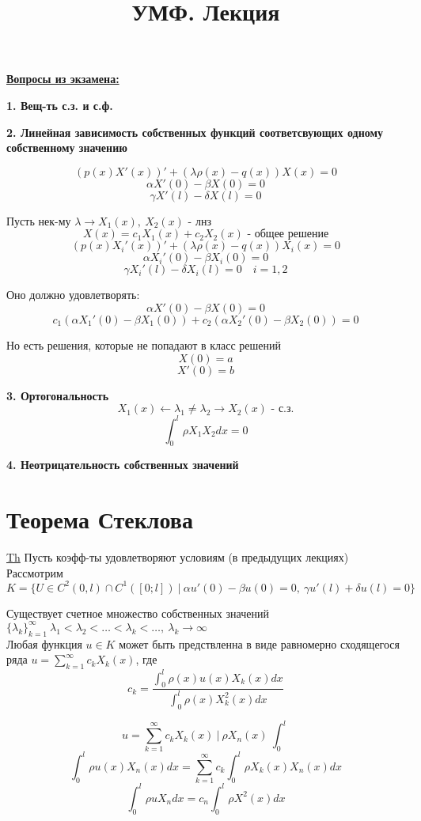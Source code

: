 \documentclass[a4paper]{article}
\begin{document}
\title{УМФ. Лекция}
\maketitle

\textbf{\underline{Вопросы из экзамена:}}

\textbf{1. Вещ-ть с.з. и с.ф.}

\textbf{2. Линейная зависимость собственных функций соответсвующих одному собственному значению}

\[
    (p(x) X'(x))' + (\lambda \rho(x) - q(x)) X(x) = 0
\]
\[
    \alpha X'(0) - \beta X(0) = 0
\]
\[
    \gamma X'(l) - \delta X(l) = 0
\]

Пусть нек-му $ \lambda \rightarrow X_1(x), \ X_2(x) $ - лнз
\[
    X(x) = c_1 X_1(x) + c_2 X_2(x) \text{ - общее решение}
\]
\[
    (p(x) X_i'(x))' + (\lambda \rho(x) - q(x)) X_i(x) = 0
\]
\[
    \alpha X_i'(0) - \beta X_i(0) = 0
\]
\[
    \gamma X_i'(l) - \delta X_i(l) = 0 \quad i = 1,2
\]

Оно должно удовлетворять:
\[
    \alpha X'(0) - \beta X(0) = 0
\]
\[
    c_1 (\alpha X_1'(0) - \beta X_1(0)) + c_2 (\alpha X_2'(0) - \beta X_2(0)) = 0
\]

Но есть решения, которые не попадают в класс решений
\[
    X(0) = a
\]
\[
    X'(0) = b
\]

\textbf{3. Ортогональность}
\[
    X_1(x) \leftarrow \lambda_1 \neq \lambda_2 \rightarrow X_2(x) \text{ - с.з.}
\]
\[
    \int_{0}^{l} \rho X_1 X_2 dx = 0
\]

\textbf{4. Неотрицательность собственных значений}

\section*{\centering Теорема Стеклова}

\begin{tcolorbox}
    \underline{Th} Пусть коэфф-ты удовлетворяют условиям (в предыдущих лекциях)\\
    Рассмотрим $ K = \{ U \in C^2(0, l) \cap C^{1}([0; l]) \ | \ \alpha u'(0) - \beta
    u(0) = 0, \ \gamma u'(l) + \delta u(l) = 0\} $ 

    Существует счетное множество собственных значений $ \{ \lambda_k \}_{k=1}^{\infty}\ 
    \lambda_1 < \lambda_2 < \dots < \lambda_k < \dots , \ \lambda_k \to \infty$ \\
    Любая функция $ u \in K $ может быть предствленна в виде равномерно сходящегося 
    ряда $ u = \sum_{k=1}^{\infty} c_k X_k(x) $, где 
    \[
        c_k = \frac{\int_{0}^{l} \rho(x) u(x) X_k(x) dx }
        {\int_{0}^{l} \rho(x) X_k^2(x) dx}
    \]

    \[
        u = \sum_{k=1}^{\infty} c_k X_k(x) \ | \ \rho X_n(x) \ \int_{0}^{l}  
    \]
    \[
        \int_{0}^{l} \rho u(x) X_n(x) dx = \sum_{k=1}^{\infty} c_k 
        \int_{0}^{l} \rho X_k(x) X_n(x) dx
    \]
    \[
        \int_{0}^{l} \rho u X_n dx = c_n \int_{0}^{l} \rho X^2(x) dx
    \]
\end{tcolorbox}
\end{document}
